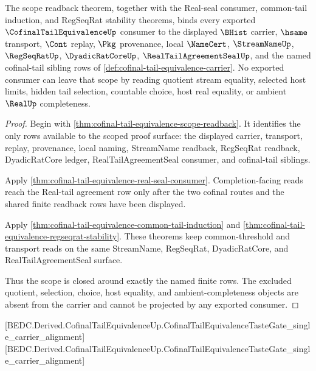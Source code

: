 \begin{theorem}
\label{thm:cofinal-tail-equivalence-scoped-closure}
The scope readback theorem, together with the Real-seal consumer, common-tail induction, and RegSeqRat stability theorems, binds every exported $\CofinalTailEquivalenceUp$ consumer to the displayed $\BHist$ carrier, $\hsame$ transport, $\Cont$ replay, $\Pkg$ provenance, local $\NameCert$, $\StreamNameUp$, $\RegSeqRatUp$, $\DyadicRatCoreUp$, $\RealTailAgreementSealUp$, and the named cofinal-tail sibling rows of \autoref{def:cofinal-tail-equivalence-carrier}. No exported consumer can leave that scope by reading quotient stream equality, selected host limits, hidden tail selection, countable choice, host real equality, or ambient $\RealUp$ completeness.
\end{theorem}
\begin{proof}
Begin with \autoref{thm:cofinal-tail-equivalence-scope-readback}. It identifies the only rows available to the scoped proof surface: the displayed carrier, transport, replay, provenance, local naming, StreamName readback, RegSeqRat readback, DyadicRatCore ledger, RealTailAgreementSeal consumer, and cofinal-tail siblings.

Apply \autoref{thm:cofinal-tail-equivalence-real-seal-consumer}. Completion-facing reads reach the Real-tail agreement row only after the two cofinal routes and the shared finite readback rows have been displayed.

Apply \autoref{thm:cofinal-tail-equivalence-common-tail-induction} and \autoref{thm:cofinal-tail-equivalence-regseqrat-stability}. These theorems keep common-threshold and transport reads on the same StreamName, RegSeqRat, DyadicRatCore, and RealTailAgreementSeal surface.

Thus the scope is closed around exactly the named finite rows. The excluded quotient, selection, choice, host equality, and ambient-completeness objects are absent from the carrier and cannot be projected by any exported consumer.
\end{proof}

[BEDC.Derived.CofinalTailEquivalenceUp.CofinalTailEquivalenceTasteGate\_single\_carrier\_alignment]
[BEDC.Derived.CofinalTailEquivalenceUp.CofinalTailEquivalenceTasteGate\_single\_carrier\_alignment]

